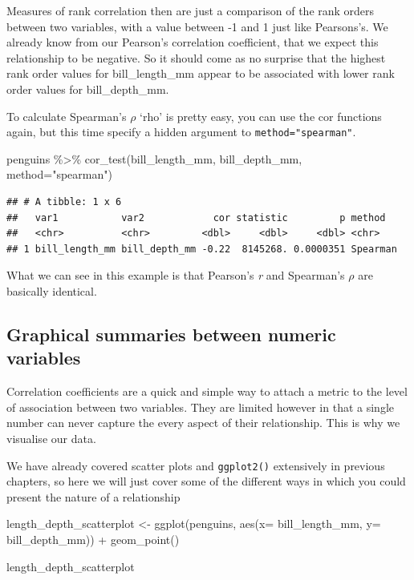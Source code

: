 \documentclass[
]{book}
\newenvironment{Shaded}{\begin{snugshade}}{\end{snugshade}}
\newcommand{\AttributeTok}[1]{\textcolor[rgb]{0.77,0.63,0.00}{#1}}
\newcommand{\FunctionTok}[1]{\textcolor[rgb]{0.00,0.00,0.00}{#1}}
\newcommand{\NormalTok}[1]{#1}
\newcommand{\OtherTok}[1]{\textcolor[rgb]{0.56,0.35,0.01}{#1}}
\newcommand{\SpecialCharTok}[1]{\textcolor[rgb]{0.00,0.00,0.00}{#1}}
\newcommand{\StringTok}[1]{\textcolor[rgb]{0.31,0.60,0.02}{#1}}
\begin{document}
Measures of rank correlation then are just a comparison of the rank orders between two variables, with a value between -1 and 1 just like Pearsons's. We already know from our Pearson's correlation coefficient, that we expect this relationship to be negative. So it should come as no surprise that the highest rank order values for bill\_length\_mm appear to be associated with lower rank order values for bill\_depth\_mm.

To calculate Spearman's \(\rho\) `rho' is pretty easy, you can use the cor functions again, but this time specify a hidden argument to \texttt{method="spearman"}.

\begin{Shaded}
\begin{Highlighting}[]
\NormalTok{penguins }\SpecialCharTok{\%\textgreater{}\%} 
  \FunctionTok{cor\_test}\NormalTok{(bill\_length\_mm, bill\_depth\_mm, }\AttributeTok{method=}\StringTok{"spearman"}\NormalTok{)}
\end{Highlighting}
\end{Shaded}

\begin{verbatim}
## # A tibble: 1 x 6
##   var1           var2            cor statistic         p method  
##   <chr>          <chr>         <dbl>     <dbl>     <dbl> <chr>   
## 1 bill_length_mm bill_depth_mm -0.22  8145268. 0.0000351 Spearman
\end{verbatim}

What we can see in this example is that Pearson's \emph{r} and Spearman's \(\rho\) are basically identical.

\hypertarget{graphical-summaries-between-numeric-variables}{%
\subsection{Graphical summaries between numeric variables}\label{graphical-summaries-between-numeric-variables}}

Correlation coefficients are a quick and simple way to attach a metric to the level of association between two variables. They are limited however in that a single number can never capture the every aspect of their relationship. This is why we visualise our data.

We have already covered scatter plots and \texttt{ggplot2()} extensively in previous chapters, so here we will just cover some of the different ways in which you could present the nature of a relationship

\begin{Shaded}
\begin{Highlighting}[]
\NormalTok{length\_depth\_scatterplot }\OtherTok{\textless{}{-}} \FunctionTok{ggplot}\NormalTok{(penguins, }\FunctionTok{aes}\NormalTok{(}\AttributeTok{x=}\NormalTok{ bill\_length\_mm, }
                     \AttributeTok{y=}\NormalTok{ bill\_depth\_mm)) }\SpecialCharTok{+}
    \FunctionTok{geom\_point}\NormalTok{()}

\NormalTok{length\_depth\_scatterplot}
\end{Highlighting}
\end{Shaded}
\end{document}
